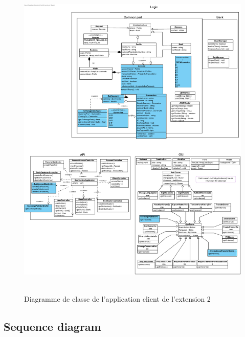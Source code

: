 \documentclass[]{report}
\begin{document}
\begin{figure}[h!]
	\hbox{
		\centering\includegraphics[scale=0.69]{img/Class Diagram Client - Extension 2.pdf}
	}
	\caption{Diagramme de classe de l'application client de l'extension 2}
\end{figure}
\newpage

\newpage

\subsection{Sequence diagram}
\end{document}
